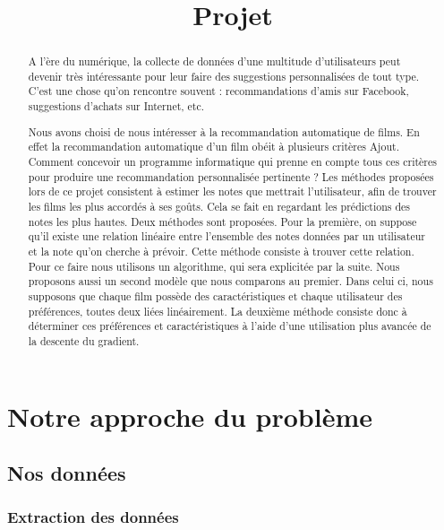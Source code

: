 \documentclass[a4paper,10pt]{article}
\title{Projet}
\author{}
\begin{document}
\maketitle

\begin{abstract}
A l’ère du numérique, la collecte de données d’une multitude d’utilisateurs peut devenir très intéressante pour leur faire des suggestions personnalisées de tout type. C’est une chose qu’on rencontre souvent : recommandations d’amis sur Facebook, suggestions d’achats sur Internet, etc.

Nous avons choisi de nous intéresser à la recommandation automatique de films. En effet la recommandation automatique d’un film obéit à plusieurs critères Ajout. Comment concevoir un programme informatique qui prenne en compte tous ces critères pour produire une recommandation personnalisée pertinente ?
Les méthodes proposées lors de ce projet consistent à estimer les notes que mettrait l’utilisateur, afin de trouver les films les plus accordés à ses goûts. Cela se fait en regardant les prédictions des notes les plus hautes. Deux méthodes sont proposées. Pour la première, on suppose qu’il existe une relation linéaire entre l’ensemble des notes données par un utilisateur et la note qu’on cherche à prévoir. Cette méthode consiste à trouver cette relation. Pour ce faire nous utilisons un algorithme, qui sera explicitée par la suite. Nous proposons aussi un second modèle que nous comparons au premier. Dans celui ci, nous supposons que chaque film possède des caractéristiques et chaque utilisateur des préférences, toutes deux liées linéairement. La deuxième méthode consiste donc à déterminer ces préférences et caractéristiques à l’aide d’une utilisation plus avancée de la descente du gradient.
\end{abstract}
\section{Notre approche du problème}
\subsection{Nos données}
\subsubsection{Extraction des données}
\end{document}
